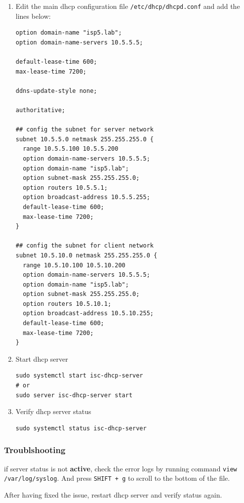 \documentclass[11pt]{article}
\begin{document}
\begin{enumerate}
\item Edit the main dhcp configuration file \texttt{/etc/dhcp/dhcpd.conf} and add the lines below:

\begin{verbatim}
option domain-name "isp5.lab";
option domain-name-servers 10.5.5.5;

default-lease-time 600;
max-lease-time 7200;

ddns-update-style none;

authoritative;

## config the subnet for server network
subnet 10.5.5.0 netmask 255.255.255.0 {
  range 10.5.5.100 10.5.5.200
  option domain-name-servers 10.5.5.5;
  option domain-name "isp5.lab";
  option subnet-mask 255.255.255.0;
  option routers 10.5.5.1;
  option broadcast-address 10.5.5.255;
  default-lease-time 600;
  max-lease-time 7200;
}

## config the subnet for client network
subnet 10.5.10.0 netmask 255.255.255.0 {
  range 10.5.10.100 10.5.10.200
  option domain-name-servers 10.5.5.5;
  option domain-name "isp5.lab";
  option subnet-mask 255.255.255.0;
  option routers 10.5.10.1;
  option broadcast-address 10.5.10.255;
  default-lease-time 600;
  max-lease-time 7200;
}
\end{verbatim}

\item Start dhcp server
\begin{verbatim}
sudo systemctl start isc-dhcp-server
# or
sudo server isc-dhcp-server start
\end{verbatim}

\item Verify dhcp server status
\begin{verbatim}
sudo systemctl status isc-dhcp-server
\end{verbatim}
\end{enumerate}

\subsubsection{Troublshooting}
\label{sec:orgab1f322}

if server status is not \textbf{active}, check the error logs by running command \texttt{view /var/log/syslog}.
And press \texttt{SHIFT + g} to scroll to the bottom of the file.

After having fixed the issue, restart dhcp server and verify status again.
\end{document}
